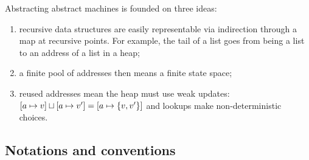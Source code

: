 Abstracting abstract machines is founded on three ideas:
\begin{enumerate}
\item{recursive data structures are easily representable via indirection through a map at recursive points. For example, the tail of a list goes from being a list to an address of a list in a heap;}
\item{a finite pool of addresses then means a finite state space;}
\item{reused addresses mean the heap must use weak updates: $[a \mapsto v]\sqcup[a \mapsto v'] = [a \mapsto \{ v,v' \}]$ and lookups make non-deterministic choices.}
\end{enumerate}

\subsection{Notations and conventions}
